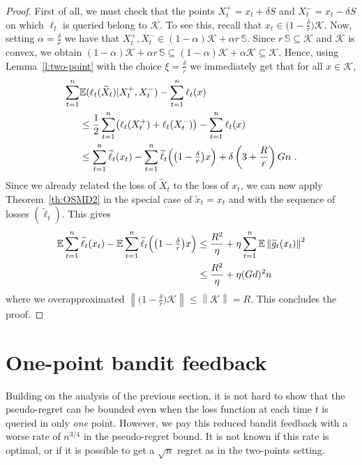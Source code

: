\documentclass[11pt]{hackednow}
\newcommand{\E}{\mathbb{E}}
\newcommand{\cK}{\mathcal{K}}
\renewcommand{\tilde}{\widetilde}
\newcommand{\Sphere}{\mathbb{S}}
\newcommand{\norm}[1]{\left\|{#1}\right\|}
\newcommand{\tX}{\widetilde{X}}
\newcommand{\tloss}{\widetilde{\ell}}
\newcommand{\gtilde}{\widetilde{g}}
\begin{document}
\begin{proof}
First of all, we must check that the points $X_t^+ = x_t + \delta S$ and $X_t^- = x_t - \delta S$ on which $\ell_t$ is queried belong to $\cK$. To see this, recall that $x_t\in \bigl(1-\tfrac{\delta}{r}\bigr)\cK$. Now, setting $\alpha = \tfrac{\delta}{r}$ we have that $X_t^+,X_t^- \in (1-\alpha)\cK + \alpha r\,\Sphere$. Since $r\,\Sphere \subseteq \cK$ and $\cK$ is convex, we obtain $(1-\alpha)\cK + \alpha r\,\Sphere \subseteq (1-\alpha)\cK + \alpha\cK \subseteq \cK$. Hence, using Lemma~\ref{l:two-point} with the choice $\xi = \tfrac{\delta}{r}$ we immediately get that for all $x\in\cK$,
\begin{align*}
    \sum_{t=1}^n & \E( \ell_t(\tX_t) | X_t^+, X_t^-) - \sum_{t=1}^n \ell_t(x)
\\& \le
    \frac{1}{2}\sum_{t=1}^n \bigl(\ell_t(X_t^+) + \ell_t(X_t^-)\bigr) - \sum_{t=1}^n \ell_t(x)
\\& \le
    \sum_{t=1}^n \tloss_t(x_t) - \sum_{t=1}^n \tloss_t\Bigl(\bigl(1-\tfrac{\delta}{r}\bigr)x\Bigr) + \delta\left(3 + \frac{R}{r} \right) G n~.
\end{align*}
Since we already related the loss of $\tX_t$ to the loss of $x_t$, we can now apply Theorem~\ref{th:OSMD2} in the special case of $\tilde{x}_t = x_t$ and with the sequence of losses $(\tloss_t)$. This gives
\begin{align*}
    \E \sum_{t=1}^n \tloss_t(x_t) - \E \sum_{t=1}^n \tloss_t\Bigl(\bigl(1-\tfrac{\delta}{r}\bigr)x\Bigr)
& \le
    \frac{R^2}{\eta} + \eta\sum_{t=1}^n \E \norm{\gtilde_t(x_t)}^2
\\& \le
    \frac{R^2}{\eta} + \eta (Gd)^2 n
\end{align*}
where we overapproximated $\norm{\bigl(1-\tfrac{\delta}{r}\bigr)\cK} \le \norm{\cK} = R$. This concludes the proof.
\end{proof}


\section{One-point bandit feedback}
Building on the analysis of the previous section, it is not hard to show that the pseudo-regret can be bounded even when the loss function at each time $t$ is queried in only \textsl{one} point. However, we pay this reduced bandit feedback with a worse rate of $n^{3/4}$ in the pseudo-regret bound. It is not known if this rate is optimal, or if it is possible to get a $\sqrt{n}$ regret as in the two-points setting.
\end{document}
